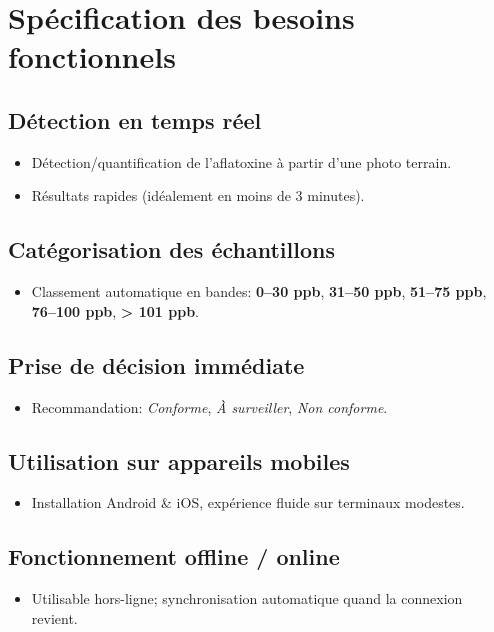 \documentclass[12pt,a4paper]{report}
\begin{document}
\cleardoublepage
\section{Spécification des besoins fonctionnels}

\subsection*{Détection en temps réel}
\begin{itemize}
    \item Détection/quantification de l’aflatoxine à partir d’une photo terrain.
    \item Résultats rapides (idéalement en moins de 3 minutes).
\end{itemize}

\subsection*{Catégorisation des échantillons}
\begin{itemize}
    \item Classement automatique en bandes: \textbf{0–30 ppb}, \textbf{31–50 ppb}, \textbf{51–75 ppb}, \textbf{76–100 ppb}, \textbf{> 101 ppb}.
\end{itemize}

\subsection*{Prise de décision immédiate}
\begin{itemize}
    \item Recommandation: \textit{Conforme}, \textit{À surveiller}, \textit{Non conforme}.
\end{itemize}

\subsection*{Utilisation sur appareils mobiles}
\begin{itemize}
    \item Installation Android \& iOS, expérience fluide sur terminaux modestes.
\end{itemize}

\subsection*{Fonctionnement offline / online}
\begin{itemize}
    \item Utilisable hors-ligne; synchronisation automatique quand la connexion revient.
\end{itemize}
\end{document}
